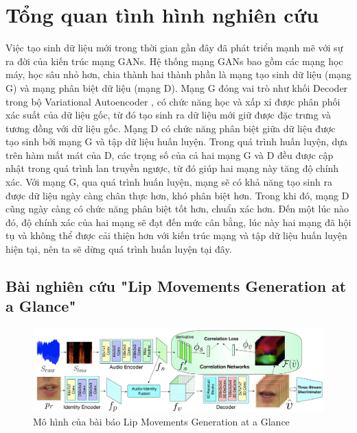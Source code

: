 \section{\texorpdfstring{Tổng quan tình hình nghiên cứu}{overview}}
Việc tạo sinh dữ liệu mới trong thời gian gần đây đã phát triển mạnh mẽ với sự ra đời của kiến trúc mạng GANs. Hệ thống mạng GANs bao gồm các mạng học máy, học sâu nhỏ hơn, chia thành hai thành phần là mạng tạo sinh dữ liệu (mạng G) và mạng phân biệt dữ liệu (mạng D). Mạng G đóng vai trò như khối Decoder trong bộ Variational Autoencoder \cite{vae_base},  có chức năng học và xấp xỉ được phân phối xác suất của dữ liệu gốc, từ đó tạo sinh ra dữ liệu mới giữ được đặc trưng và tương đồng với dữ liệu gốc. Mạng D có chức năng phân biệt giữa dữ liệu được tạo sinh bởi mạng G và tập dữ liệu huấn luyện. Trong quá trình huấn luyện, dựa trên hàm mất mát của D, các trọng số của cả hai mạng G và D đều được cập nhật trong quá trình lan truyền ngược, từ đó giúp hai mạng này tăng độ chính xác. Với mạng G, qua quá trình huấn luyện, mạng sẽ có khả năng tạo sinh ra được dữ liệu ngày càng chân thực hơn, khó phân biệt hơn. Trong khi đó, mạng D cũng ngày càng có chức năng phân biệt tốt hơn, chuẩn xác hơn. Đến một lúc nào đó, độ chính xác của hai mạng sẽ đạt đến mức cân bằng, lúc này hai mạng đã hội tụ và không thể được cải thiện hơn với kiến trúc mạng và tập dữ liệu huấn luyện hiện tại, nên ta sẽ dừng quá trình huấn luyện tại đây.


\subsection{\texorpdfstring{Bài nghiên cứu "Lip Movements Generation at a Glance"\cite{chen2018}}{Target}}

\begin{figure}[H]
    \centering
    \includegraphics[width=15cm]{./content/images/chen2018_model.png}
    \caption{Mô hình của bài báo Lip Movements Generation at a Glance}
    \label{fig:chen2018_model}
\end{figure}


